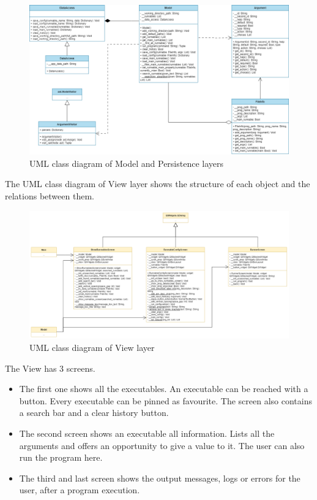 \documentclass{article}
\begin{document}
\begin{figure}[h]
    \centering
    \includegraphics[width=1\linewidth]{img/class_diagram_model_persistence.drawio.png}
    \caption{UML class diagram of Model and Persistence layers}
    \label{fig:enter-label}
\end{figure}

The UML class diagram of View layer shows the structure of each object and the relations between them.

\begin{figure}[h]
    \centering
    \includegraphics[width=1\linewidth]{img/class_diagram_view.drawio.png}
    \caption{UML class diagram of View layer}
    \label{fig:enter-label}
\end{figure}

The View has 3 screens.

\begin{itemize}
    \item The first one shows all the executables. An executable can be reached with a button. Every executable can be pinned as favourite. The screen also contains a search bar and a clear history button.
    \item The second screen shows an executable all information. Lists all the arguments and offers an opportunity to give a value to it. The user can also run the program here.
    \item The third and last screen shows the output messages, logs or errors for the user, after a program execution.
\end{itemize}
\end{document}
